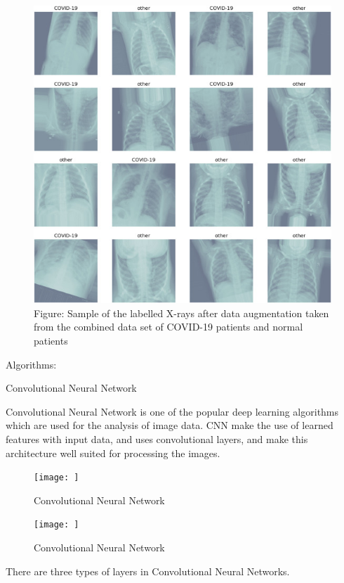 \begin{figure}
    \centering
        \includegraphics{assets/chest.png}
    \caption{Figure: Sample of the labelled X-rays after data augmentation taken from the combined data set of COVID-19 patients and normal patients }
\end{figure}

Algorithms: 

Convolutional Neural Network 

Convolutional Neural Network is one of the popular deep learning algorithms which are used for the analysis of image data. CNN make the use of learned features with input data, and uses convolutional layers, and make this architecture well suited for processing the images. 

 

 
\begin{figure}
    \centering
    \texttt{[image: ]}
    \caption{Convolutional Neural Network}
\end{figure}
 

 
\begin{figure}
    \centering
    \texttt{[image: ]}
    \caption{Convolutional Neural Network ~\cite{Uddin2021}}
\end{figure}

There are three types of layers in Convolutional Neural Networks.  

